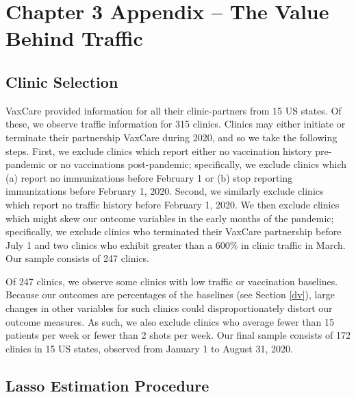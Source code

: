 \chapter{Chapter 3 Appendix -- The Value Behind Traffic}

\section{Clinic Selection} \label{app_clinicSelection}
 VaxCare provided information for all their clinic-partners from 15 US states. Of these, we observe traffic information for 315 clinics. Clinics may either initiate or terminate their partnership VaxCare during 2020, and so we take the following steps. First, we exclude clinics which report either no vaccination history pre-pandemic or no vaccinations post-pandemic; specifically, we exclude clinics which (a) report no immunizations before February 1 or (b) stop reporting immunizations before February 1, 2020. Second, we similarly exclude clinics which report no traffic history before February 1, 2020. We then exclude clinics which might skew our outcome variables in the early months of the pandemic; specifically, we exclude clinics who terminated their VaxCare partnership before July 1 and two clinics who exhibit greater than a 600\% in clinic traffic in March. Our sample consists of 247 clinics.
 
 Of 247 clinics, we observe some clinics with low traffic or vaccination baselines. Because our outcomes are percentages of the baselines (see Section \ref{dv}), large changes in other variables for such clinics could disproportionately distort our outcome measures. As such, we also exclude clinics who average fewer than 15 patients per week or fewer than 2 shots per week. Our final sample consists of 172 clinics in 15 US states, observed from January 1 to August 31, 2020. 
 
\section{Lasso Estimation Procedure} \label{app_lassoProc}

